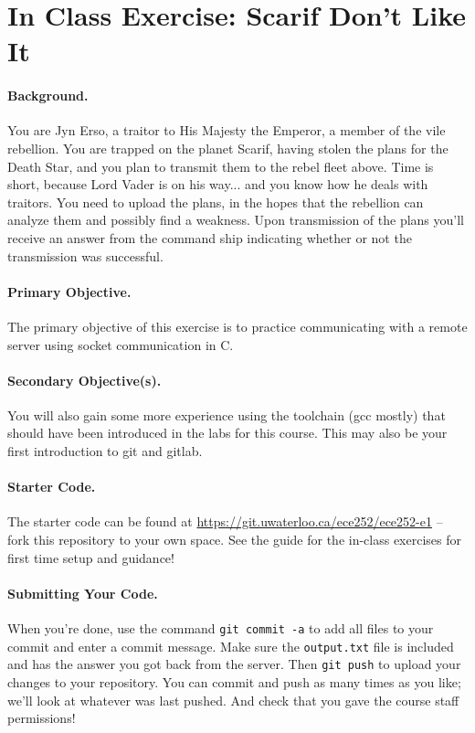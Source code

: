 




\section*{In Class Exercise: Scarif Don't Like It}

\paragraph{Background.}
You are Jyn Erso, a traitor to His Majesty the Emperor, a member of the vile rebellion. You are trapped on the planet Scarif, having stolen the plans for the Death Star, and you plan to transmit them to the rebel fleet above. Time is short, because Lord Vader is on his way... and you know how he deals with traitors. You need to upload the plans, in the hopes that the rebellion can analyze them and possibly find a weakness. Upon transmission of the plans you'll receive an answer from the command ship indicating whether or not the transmission was successful.

\paragraph{Primary Objective.} The primary objective of this exercise is to practice communicating with a remote server using socket communication in C. 

\paragraph{Secondary Objective(s).} You will also gain some more experience using the toolchain (gcc mostly) that should have been introduced in the labs for this course. This may also be your first introduction to git and gitlab.

\paragraph{Starter Code.} The starter code can be found at \url{https://git.uwaterloo.ca/ece252/ece252-e1} -- fork this repository to your own space. See the guide for the in-class exercises for first time setup and guidance!

\paragraph{Submitting Your Code.} When you're done, use the command \texttt{git commit -a} to add all files to your commit and enter a commit message. Make sure the \texttt{output.txt} file is included and has the answer you got back from the server. Then \texttt{git push} to upload your changes to your repository. You can commit and push as many times as you like; we'll look at whatever was last pushed. And check that you gave the course staff permissions!

